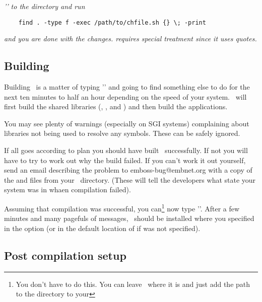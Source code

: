 \documentclass{report}
\begin{document}
{\it
'' to the  directory and run}
\begin{verbatim}
	find . -type f -exec /path/to/chfile.sh {} \; -print
\end{verbatim}
{\it and you are done with the  changes.  requires special 
treatment since it uses quotes.
}

\subsection{Building \EMBOSS}

Building \EMBOSS\ is a matter of typing '' and going to find something else to do for the next ten minutes to half an hour depending on the speed of your system. \EMBOSS\ will first build the shared libraries (, , and ) and then build the applications.

You may see plenty of warnings (especially on SGI systems) complaining about libraries not being used to resolve any symbols. These can be safely ignored.

If all goes according to plan you should have built \EMBOSS\ successfully. If not you will have to try to work out why the build failed. If you can't work it out yourself, send an email describing the problem to emboss-bug@embnet.org with a copy of the  and  files from your \EMBOSS\ directory. (These will tell the developers what state your system was in whaen compilation failed).

Assuming that compilation was successful, you can\footnote{You don't have to do this. You can leave \EMBOSS\ where it is and just add the path to the  directory to your }  now type ''. After a few minutes and many pagefuls of messages, \EMBOSS\ should be installed where you specified in the  option (or in the default location of  if  was not specified).

\subsection{Post compilation setup}
\end{document}
